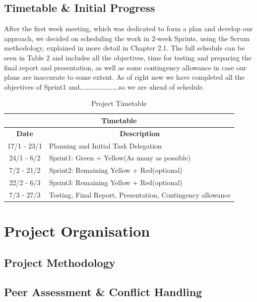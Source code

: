 \documentclass[11pt]{article}
\begin{document}
	\subsection{Timetable \& Initial Progress}
	After the first week meeting, which was dedicated to form a plan and develop our approach, we decided on scheduling the work in 2-week Sprints, using the Scrum methodology, explained in more detail in Chapter 2.1. The full schedule can be seen in Table 2 and includes all the objectives, time for testing and preparing the final report and presentation, as well as some contingency allowance in case our plans are inaccurate to some extent. As of right now we have completed all the objectives of Sprint1 and…………………….so we are ahead of schedule.\\
	\begin{table}[]
\begin{tabular}{|c|l|}
\hline
\multicolumn{2}{|c|}{\cellcolor[HTML]{38FFF8}\textbf{Timetable}}           \\ \hline
\textbf{Date} & \multicolumn{1}{c|}{\textbf{Description}}                  \\ \hline
17/1 - 23/1   & Planning and Initial Task Delegation                                                   \\ \hline
24/1 - 6/2    & Sprint1: Green + Yellow(As many as possible)               \\ \hline
7/2 - 21/2    & Sprint2: Remaining Yellow + Red(optional)                  \\ \hline
22/2 - 6/3    & Sprint3: Remaining Yellow + Red(optional)                  \\ \hline
7/3 - 27/3    & Testing, Final Report, Presentation, Contingency allowance \\ \hline
\end{tabular}
\caption{Project Timetable}
\end{table}
\section{Project Organisation}
	\subsection{Project Methodology}
	\subsection{Peer Assessment \& Conflict Handling}
\end{document}
